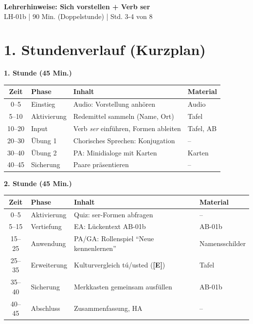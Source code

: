 \documentclass[11pt, a4paper]{article}
\newcommand{\fachfarbe}{spanisch}
\newcommand{\thema}{Sich vorstellen + Verb ser}
\newcommand{\sequenz}{01}
\newcommand{\block}{b}
\newcommand{\dauer}{90 Min. (Doppelstunde)}
\newcommand{\E}{\textcolor{erweiterung}{\textbf{[E]}}}
\begin{document}
\begin{center}
    {\Large\bfseries\textcolor{\fachfarbe}{Lehrerhinweise: \thema}}\\[0.3em]
    {\normalsize LH-\sequenz\block{} | \dauer{} | Std. 3-4 von 8}
\end{center}

\vspace{10pt}


\section*{1. Stundenverlauf (Kurzplan)}

\textbf{1. Stunde (45 Min.)}

\begin{tabularx}{\textwidth}{|c|l|X|l|}
\hline
\textbf{Zeit} & \textbf{Phase} & \textbf{Inhalt} & \textbf{Material} \\
\hline
0--5 & Einstieg & Audio: Vorstellung anhören & Audio \\
\hline
5--10 & Aktivierung & Redemittel sammeln (Name, Ort) & Tafel \\
\hline
10--20 & Input & Verb \textit{ser} einführen, Formen ableiten & Tafel, AB \\
\hline
20--30 & Übung 1 & Chorisches Sprechen: Konjugation & -- \\
\hline
30--40 & Übung 2 & PA: Minidialoge mit Karten & Karten \\
\hline
40--45 & Sicherung & Paare präsentieren & -- \\
\hline
\end{tabularx}

\vspace{1em}

\textbf{2. Stunde (45 Min.)}

\begin{tabularx}{\textwidth}{|c|l|X|l|}
\hline
\textbf{Zeit} & \textbf{Phase} & \textbf{Inhalt} & \textbf{Material} \\
\hline
0--5 & Aktivierung & Quiz: ser-Formen abfragen & -- \\
\hline
5--15 & Vertiefung & EA: Lückentext AB-01b & AB-01b \\
\hline
15--25 & Anwendung & PA/GA: Rollenspiel ``Neue kennenlernen'' & Namensschilder \\
\hline
25--35 & Erweiterung & Kulturvergleich tú/usted (\E{}) & Tafel \\
\hline
35--40 & Sicherung & Merkkasten gemeinsam ausfüllen & AB-01b \\
\hline
40--45 & Abschluss & Zusammenfassung, HA & -- \\
\hline
\end{tabularx}
\end{document}
